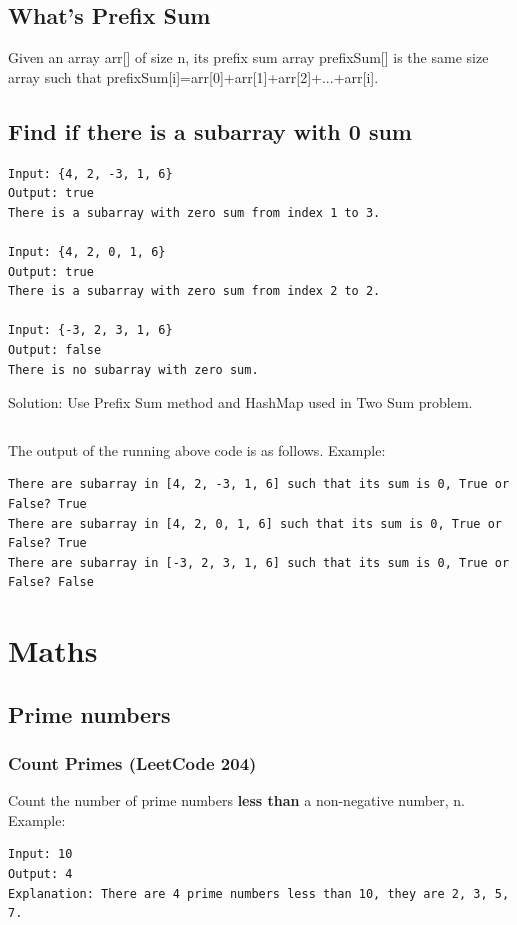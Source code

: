 \documentclass[11pt]{article}
\begin{document}
\subsection{What's Prefix Sum}
Given an array arr[] of size n, its prefix sum array prefixSum[] is the same size array such that prefixSum[i]=arr[0]+arr[1]+arr[2]+...+arr[i].
\subsection{Find if there is a subarray with 0 sum}

\begin{verbatim}
Input: {4, 2, -3, 1, 6}
Output: true 
There is a subarray with zero sum from index 1 to 3.

Input: {4, 2, 0, 1, 6}
Output: true 
There is a subarray with zero sum from index 2 to 2.

Input: {-3, 2, 3, 1, 6}
Output: false
There is no subarray with zero sum.
\end{verbatim}

Solution: Use Prefix Sum method and HashMap used in Two Sum problem. 

\inputminted[breaklines=true,frame=leftline, linenos=true]{python}{src/subarraySum0.py}

The output of the running above code is as follows. 
Example:
\begin{verbatim}
There are subarray in [4, 2, -3, 1, 6] such that its sum is 0, True or False? True
There are subarray in [4, 2, 0, 1, 6] such that its sum is 0, True or False? True
There are subarray in [-3, 2, 3, 1, 6] such that its sum is 0, True or False? False
\end{verbatim}

\section{Maths}
\subsection{Prime numbers}
\subsubsection{Count Primes (LeetCode 204)}
Count the number of prime numbers \textbf{less than} a non-negative number, n.
Example:
\begin{verbatim}
Input: 10
Output: 4
Explanation: There are 4 prime numbers less than 10, they are 2, 3, 5, 7.
\end{verbatim}
\end{document}
